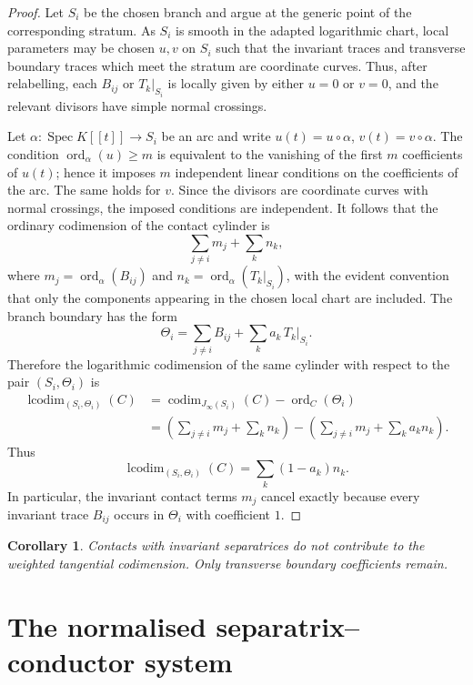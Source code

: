 \documentclass[11pt]{amsart}
\numberwithin{equation}{section}
\theoremstyle{plain}
\newtheorem{Corollary}[Theorem]{Corollary}
\theoremstyle{definition}
\newcommand{\Spec}{\operatorname{Spec}}
\newcommand{\codim}{\operatorname{codim}}
\newcommand{\ord}{\operatorname{ord}}
\newcommand{\lcodim}{\operatorname{lcodim}}
\begin{document}
\begin{proof}
Let \(S_i\) be the chosen branch and argue at the generic point of the corresponding stratum. As \(S_i\) is smooth in the adapted logarithmic chart, local parameters may be chosen \(u,v\) on \(S_i\) such that the invariant traces and transverse boundary traces which meet the stratum are coordinate curves. Thus, after relabelling, each \(B_{ij}\) or \(T_k|_{S_i}\) is locally given by either \(u=0\) or \(v=0\), and the relevant divisors have simple normal crossings.

Let \(\alpha:\Spec K[[t]]\to S_i\) be an arc and write \(u(t)=u\circ\alpha\), \(v(t)=v\circ\alpha\). The condition \(\ord_\alpha(u)\ge m\) is equivalent to the vanishing of the first \(m\) coefficients of \(u(t)\); hence it imposes \(m\) independent linear conditions on the coefficients of the arc. The same holds for \(v\). Since the divisors are coordinate curves with normal crossings, the imposed conditions are independent. It follows that the ordinary codimension of the contact cylinder is
\[
\sum_{j\ne i}m_j+\sum_k n_k,
\]
where \(m_j=\ord_\alpha(B_{ij})\) and \(n_k=\ord_\alpha(T_k|_{S_i})\), with the evident convention that only the components appearing in the chosen local chart are included.
The branch boundary has the form
\[
\Theta_i=\sum_{j\ne i}B_{ij}+\sum_k a_k\,T_k|_{S_i}.
\]
Therefore the logarithmic codimension of the same cylinder with respect to the pair \((S_i,\Theta_i)\) is
\[
\begin{aligned}
\lcodim_{(S_i,\Theta_i)}(C)
&=\codim_{J_\infty(S_i)}(C)-\ord_C(\Theta_i)\\
&=\left(\sum_{j\ne i}m_j+\sum_k n_k\right)
-\left(\sum_{j\ne i}m_j+\sum_k a_kn_k\right).
\end{aligned}
\]
Thus
\[
\lcodim_{(S_i,\Theta_i)}(C)
=
\sum_k(1-a_k)n_k.
\]
In particular, the invariant contact terms \(m_j\) cancel exactly because every invariant trace \(B_{ij}\) occurs in \(\Theta_i\) with coefficient \(1\).
\end{proof}

\begin{Corollary}
\label{cor:coeff-one}
Contacts with invariant separatrices do not contribute to the weighted tangential codimension.  Only transverse boundary coefficients remain.
\end{Corollary}

\section{The normalised separatrix--conductor system}
\label{sec:system}
\end{document}
